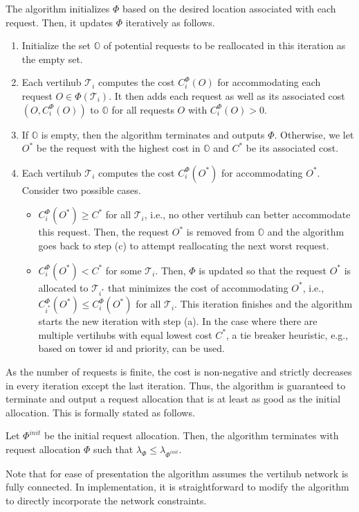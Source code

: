 The algorithm initializes $\Phi$ based on the desired location associated with each request. Then, it updates $\Phi$ iteratively as follows.
\begin{enumerate}
    \item Initialize the set $\mathbb{O}$ of potential requests to be reallocated in this iteration as the empty set.
    \item Each vertihub $\mathcal{T}_i$ computes the cost $C_i^\Phi(O)$ for accommodating each request $O \in \Phi(\mathcal{T}_i)$. It then adds each request as well as its associated cost $(O, C_i^\Phi(O))$ to $\mathbb{O}$ for all requests $O$ with $C_i^\Phi(O) > 0$.
    \item If $\mathbb{O}$ is empty, then the algorithm terminates and outputs $\Phi$. Otherwise, we let $O^*$ be the request with the highest cost in $\mathbb{O}$ and $C^*$ be its associated cost.
    \item Each vertihub $\mathcal{T}_i$ computes the cost $C_i^\Phi(O^*)$ for accommodating $O^*$. Consider two possible cases.
    \begin{itemize}
        \item $C_i^\Phi(O^*) \geq C^*$ for all $\mathcal{T}_i$, i.e., no other vertihub can better accommodate this request. Then, the request $O^*$ is removed from $\mathbb{O}$ and the algorithm goes back to step (c) to attempt reallocating the next worst request.
        \item $C_i^\Phi(O^*) < C^*$ for some $\mathcal{T}_i$. Then, $\Phi$ is updated so that the request $O^*$ is allocated to $\mathcal{T}_{i^*}$ that minimizes the cost of accommodating $O^*$, i.e., $C_{i^*}^\Phi(O^*) \leq C_i^\Phi(O^*)$ for all $\mathcal{T}_i$. This iteration finishes and the algorithm starts the new iteration with step (a). In the case where there are multiple vertihubs with equal lowest cost $C^{\ast}$, a tie breaker heuristic, e.g., based on tower id and priority, can be used.
    \end{itemize}
\end{enumerate}

As the number of requests is finite, the cost is non-negative and strictly decreases in every iteration except the last iteration.  Thus, the algorithm is guaranteed to terminate and output a request allocation that is at least as good as the initial allocation.  This is formally stated as follows.

\begin{prop}
Let $\Phi^{init}$ be the initial request allocation. Then, the algorithm terminates with request allocation $\Phi$ such that $\lambda_{\Phi} \leq \lambda_{\Phi^{init}}$.

\end{prop}

Note that for ease of presentation the algorithm assumes the vertihub network is fully connected. In implementation, it is straightforward to modify the algorithm to directly incorporate the network constraints. 